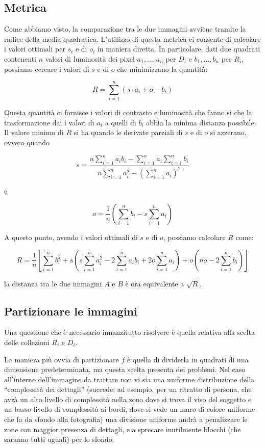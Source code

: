 \documentclass[11pt,a4paper,appendixprefix=true,numbers=noenddot]{scrreprt}
\begin{document}
\subsection*{Metrica}

Come abbiamo visto, la comparazione tra le due immagini avviene tramite la radice della media quadratica. L'utilizzo di questa metrica ci consente di calcolare i valori ottimali per $s_i$ e di $o_i$ in maniera diretta. In particolare, dati due quadrati contenenti $n$ valori di luminosità dei pixel $a_1, \dots, a_n$ per $D_i$ e $b_1, \dots, b_n$ per $R_i$, possiamo cercare i valori di $s$ e di $o$ che minimizzano la quantità:

\[
R = \sum_{i=1}^{n}{\left( s \cdot a_i + o - b_i \right) }
\]

Questa quantità ci fornisce i valori di contrasto e luminosità che fanno sì che la trasformazione dai i valori di $a_i$  a quelli di $b_i$ abbia la minima distanza possibile. Il valore minimo di $R$ si ha quando le derivate parziali di $s$ e di $o$ si azzerano, ovvero quando

\[
s = \dfrac{ n \sum\limits_{i=1}^{n}{a_i b_i} - \sum\limits_{i=1}^{n}{a_i} \sum\limits_{i=1}^{n}{b_i} }
{n \sum\limits_{i=1}^{n}{a_i^2} - {\left( \sum\limits_{i=1}^{n}{a_i} \right)}^2 }
\]

e

\[
o = \frac{1}{n} \left( \sum\limits_{i=1}^{n}{b_i} - s \sum\limits_{i=1}^{n}{a_i} \right)
\]

A questo punto, avendo i valori ottimali di $s$ e di $o$, possiamo calcolare $R$ come:

\[
R = \frac{1}{n} \left[ \sum\limits_{i=1}^{n}{b_i^2} 
+ s \left( s \sum\limits_{i=1}^{n}{a_i^2} - 2 \sum\limits_{i=1}^{n}{a_i b_i} + 2o \sum\limits_{i=1}^{n}{a_i}  \right) 
+ o \left( no - 2 \sum\limits_{i=1}^{n}{b_i} \right)  \right]
\]

la distanza tra le due immagini $A$ e $B$ è ora equivalente a $\sqrt{R}$.

\subsection*{Partizionare le immagini}

Una questione che è necessario innanzitutto risolvere è quella relativa alla scelta delle collezioni $R_i$ e $D_i$. 

La maniera più ovvia di partizionare $f$ è quella di dividerla in quadrati di una dimensione predeterminata, ma questa scelta presenta dei problemi. Nel caso all'interno dell'immagine da trattare non vi sia una uniforme distribuzione della ``complessità dei dettagli'' (succede, ad esempio, per un ritratto di persona, che avrà un alto livello di complessità nella zona dove si trova il viso del soggetto e un basso livello di complessità ai bordi, dove si vede un muro di colore uniforme che fa da sfondo alla fotografia) una divisione uniforme andrà a penalizzare le zone con maggior presenza di dettagli, e a sprecare inutilmente blocchi (che saranno tutti uguali) per lo sfondo.
\end{document}
